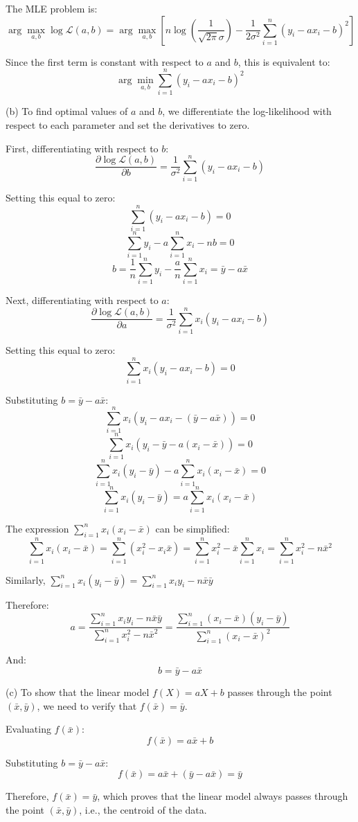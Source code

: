 The MLE problem is:
$$\arg\max_{a,b} \log \mathcal{L}(a,b) = \arg\max_{a,b} \left[n\log\left(\frac{1}{\sqrt{2\pi}\sigma}\right) -\frac{1}{2\sigma^2}\sum_{i=1}^{n}(y_i - ax_i -b)^2\right]$$

Since the first term is constant with respect to $a$ and $b$, this is equivalent to:
$$\arg\min_{a,b} \sum_{i=1}^{n}(y_i - ax_i -b)^2$$

(b) To find optimal values of $a$ and $b$, we differentiate the log-likelihood with respect to each parameter and set the derivatives to zero.

First, differentiating with respect to $b$:
$$\frac{\partial \log \mathcal{L}(a,b)}{\partial b} = \frac{1}{\sigma^2}\sum_{i=1}^{n}(y_i - ax_i -b)$$

Setting this equal to zero:
$$\sum_{i=1}^{n}(y_i - ax_i -b) = 0$$
$$\sum_{i=1}^{n}y_i - a\sum_{i=1}^{n}x_i - nb = 0$$
$$b = \frac{1}{n}\sum_{i=1}^{n}y_i - \frac{a}{n}\sum_{i=1}^{n}x_i = \bar{y} - a\bar{x}$$

Next, differentiating with respect to $a$:
$$\frac{\partial \log \mathcal{L}(a,b)}{\partial a} = \frac{1}{\sigma^2}\sum_{i=1}^{n}x_i(y_i - ax_i -b)$$

Setting this equal to zero:
$$\sum_{i=1}^{n}x_i(y_i - ax_i -b) = 0$$

Substituting $b = \bar{y} - a\bar{x}$:
$$\sum_{i=1}^{n}x_i(y_i - ax_i -(\bar{y} - a\bar{x})) = 0$$
$$\sum_{i=1}^{n}x_i(y_i - \bar{y} - a(x_i - \bar{x})) = 0$$
$$\sum_{i=1}^{n}x_i(y_i - \bar{y}) - a\sum_{i=1}^{n}x_i(x_i - \bar{x}) = 0$$
$$\sum_{i=1}^{n}x_i(y_i - \bar{y}) = a\sum_{i=1}^{n}x_i(x_i - \bar{x})$$

The expression $\sum_{i=1}^{n}x_i(x_i - \bar{x})$ can be simplified:
$$\sum_{i=1}^{n}x_i(x_i - \bar{x}) = \sum_{i=1}^{n}(x_i^2 - x_i\bar{x}) = \sum_{i=1}^{n}x_i^2 - \bar{x}\sum_{i=1}^{n}x_i = \sum_{i=1}^{n}x_i^2 - n\bar{x}^2$$

Similarly, $\sum_{i=1}^{n}x_i(y_i - \bar{y}) = \sum_{i=1}^{n}x_i y_i - n\bar{x}\bar{y}$

Therefore:
$$a = \frac{\sum_{i=1}^{n}x_i y_i - n\bar{x}\bar{y}}{\sum_{i=1}^{n}x_i^2 - n\bar{x}^2} = \frac{\sum_{i=1}^{n}(x_i - \bar{x})(y_i - \bar{y})}{\sum_{i=1}^{n}(x_i - \bar{x})^2}$$

And:
$$b = \bar{y} - a\bar{x}$$

(c) To show that the linear model $f(X) = aX + b$ passes through the point $(\bar{x},\bar{y})$, we need to verify that $f(\bar{x}) = \bar{y}$.

Evaluating $f(\bar{x})$:
$$f(\bar{x}) = a\bar{x} + b$$

Substituting $b = \bar{y} - a\bar{x}$:
$$f(\bar{x}) = a\bar{x} + (\bar{y} - a\bar{x}) = \bar{y}$$

Therefore, $f(\bar{x}) = \bar{y}$, which proves that the linear model always passes through the point $(\bar{x},\bar{y})$, i.e., the centroid of the data.

\newpage